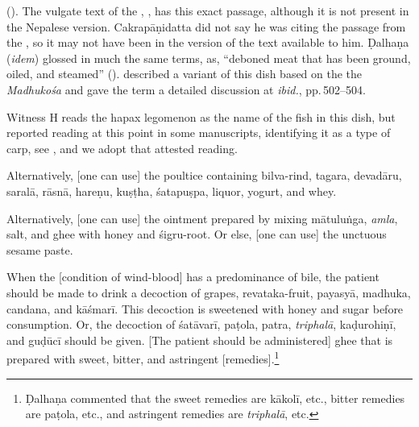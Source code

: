 \begin{translation}
{        ().  The vulgate
        text of the \SS,
        , has this exact
        passage, although it is not
        present in the Nepalese version.
        Cakrapāṇidatta did not say he was
        citing the passage from the \SS, so it may
        not have been in the
        version of the text available to him.  Ḍalhaṇa
        (\emph{idem}) glossed
         in much the same terms, as,
        “deboned meat that has been
        ground, oiled, and steamed”
        ().
        \citet[205]{meul-1974} described a variant
        of this dish based on the
        the \emph{Madhukośa} and gave the term a
        detailed discussion at
        \emph{ibid.}, pp.\,502--504.

        Witness H reads the hapax legomenon
         as the name of the fish in
        this dish, but 
        reported reading  at this
        point in some manuscripts, identifying it as a
        type of carp, see , and we
        adopt that attested reading.}




    Alternatively, [one can use] the poultice
    containing
    \gls{bilva}-rind,
    \gls{tagara},
    \gls{devadāru},
    \gls{saralā},
    \gls{rāsnā},
    \gls{hareṇu},
    \gls{kuṣṭha},
    \gls{śatapuṣpa},
    liquor, yogurt, and whey.

    Alternatively,  [one can use] the ointment
    prepared by mixing
    \gls{mātuluṅga}, \emph{amla},
    salt, and
    ghee with honey and \gls{śigru}-root. Or
    else, [one can use] the
    unctuous sesame paste. \newpage



    \item[8]
    When the [condition of wind-blood] has a
    predominance of bile, the patient
    should be made to drink a decoction of
    grapes, \gls{revataka}-fruit,
    \gls{payasyā}, \gls{madhuka},
    \gls{candana}, and \gls{kāśmarī}. This
    decoction is sweetened with honey and
    sugar before consumption. Or, the
    decoction of \gls{śatāvarī}, \gls{paṭola},
    \gls{patra}, \textit{triphalā},
    \gls{kaḍurohiṇī}, and \gls{guḍūcī} should be
    given. [The patient should be
            administered] ghee that is prepared with
    sweet, bitter, and astringent
        [remedies].\footnote{Ḍalhaṇa commented
        \citep[425]{vulgate} that the sweet
        remedies are \gls{kākolī}, etc., bitter
        remedies are \gls{paṭola}, etc., and
        astringent remedies are \textit{triphalā},
        etc.}


\end{translation}
